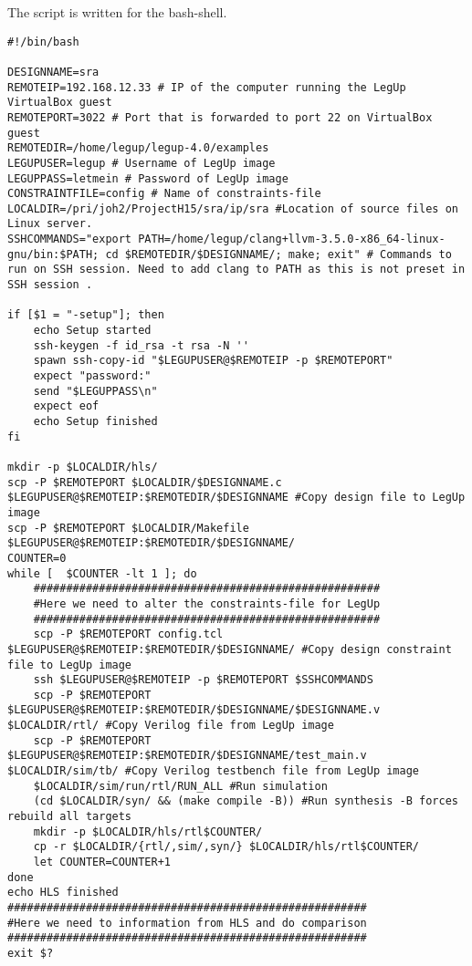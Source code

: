 The script is written for the bash-shell.
\begin{lstlisting}
#!/bin/bash

DESIGNNAME=sra
REMOTEIP=192.168.12.33 # IP of the computer running the LegUp VirtualBox guest
REMOTEPORT=3022 # Port that is forwarded to port 22 on VirtualBox guest
REMOTEDIR=/home/legup/legup-4.0/examples
LEGUPUSER=legup # Username of LegUp image
LEGUPPASS=letmein # Password of LegUp image
CONSTRAINTFILE=config # Name of constraints-file
LOCALDIR=/pri/joh2/ProjectH15/sra/ip/sra #Location of source files on Linux server.
SSHCOMMANDS="export PATH=/home/legup/clang+llvm-3.5.0-x86_64-linux-gnu/bin:$PATH; cd $REMOTEDIR/$DESIGNNAME/; make; exit" # Commands to run on SSH session. Need to add clang to PATH as this is not preset in SSH session .

if [$1 = "-setup"]; then
	echo Setup started
	ssh-keygen -f id_rsa -t rsa -N ''
	spawn ssh-copy-id "$LEGUPUSER@$REMOTEIP -p $REMOTEPORT"
	expect "password:"
	send "$LEGUPPASS\n"
	expect eof
	echo Setup finished
fi

mkdir -p $LOCALDIR/hls/
scp -P $REMOTEPORT $LOCALDIR/$DESIGNNAME.c $LEGUPUSER@$REMOTEIP:$REMOTEDIR/$DESIGNNAME #Copy design file to LegUp image
scp -P $REMOTEPORT $LOCALDIR/Makefile $LEGUPUSER@$REMOTEIP:$REMOTEDIR/$DESIGNNAME/
COUNTER=0
while [  $COUNTER -lt 1 ]; do
	#####################################################
	#Here we need to alter the constraints-file for LegUp
	#####################################################
	scp -P $REMOTEPORT config.tcl $LEGUPUSER@$REMOTEIP:$REMOTEDIR/$DESIGNNAME/ #Copy design constraint file to LegUp image
	ssh $LEGUPUSER@$REMOTEIP -p $REMOTEPORT $SSHCOMMANDS
	scp -P $REMOTEPORT $LEGUPUSER@$REMOTEIP:$REMOTEDIR/$DESIGNNAME/$DESIGNNAME.v $LOCALDIR/rtl/ #Copy Verilog file from LegUp image
	scp -P $REMOTEPORT $LEGUPUSER@$REMOTEIP:$REMOTEDIR/$DESIGNNAME/test_main.v $LOCALDIR/sim/tb/ #Copy Verilog testbench file from LegUp image
	$LOCALDIR/sim/run/rtl/RUN_ALL #Run simulation
	(cd $LOCALDIR/syn/ && (make compile -B)) #Run synthesis -B forces rebuild all targets
	mkdir -p $LOCALDIR/hls/rtl$COUNTER/
	cp -r $LOCALDIR/{rtl/,sim/,syn/} $LOCALDIR/hls/rtl$COUNTER/
	let COUNTER=COUNTER+1 
done
echo HLS finished
#######################################################
#Here we need to information from HLS and do comparison
#######################################################
exit $?
\end{lstlisting}